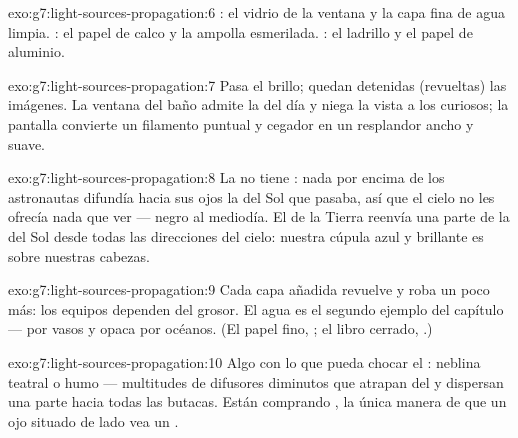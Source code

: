 \begin{solution}{exo:g7:light-sources-propagation:6}
: el vidrio de la ventana y la capa fina de agua
limpia. : el papel de calco y la ampolla esmerilada.
: el ladrillo y el papel de aluminio.
\end{solution}

\begin{solution}{exo:g7:light-sources-propagation:7}
Pasa el brillo; quedan detenidas (revueltas) las
imágenes. La ventana del baño admite la  del día y niega la
vista a los curiosos; la pantalla convierte un filamento puntual y
cegador en un resplandor ancho y suave.
\end{solution}

\begin{solution}{exo:g7:light-sources-propagation:8}
La  no tiene : nada por encima de los astronautas
difundía hacia sus ojos la  del Sol que pasaba, así que el cielo no
les ofrecía nada que ver --- negro al mediodía. El  de la
Tierra reenvía una parte de la  del Sol desde todas las direcciones
del cielo: nuestra cúpula azul y brillante es  sobre
nuestras cabezas.
\end{solution}

\begin{solution}{exo:g7:light-sources-propagation:9}
Cada capa añadida revuelve y roba un poco más: los equipos dependen
del grosor. El agua es el segundo ejemplo del capítulo ---
 por vasos y opaca por océanos. (El papel fino,
; el libro cerrado, .)
\end{solution}

\begin{solution}{exo:g7:light-sources-propagation:10}
Algo con lo que pueda chocar el : neblina teatral o humo ---
multitudes de difusores diminutos que atrapan  del  y
dispersan una parte hacia todas las butacas. Están comprando
, la única manera de que un ojo situado de lado vea un
.
\end{solution}

